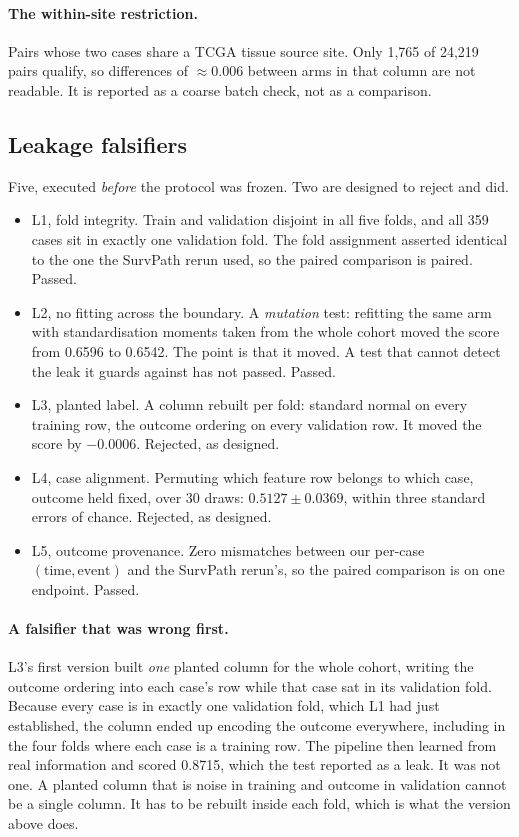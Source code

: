 \documentclass[unnumsec,webpdf,contemporary,large]{oup-authoring-template}
\begin{document}
\paragraph{The within-site restriction.} Pairs whose two cases share a TCGA tissue source site.
Only 1{,}765 of 24{,}219 pairs qualify, so differences of $\approx0.006$ between arms in that column
are not readable. It is reported as a coarse batch check, not as a comparison.

\subsection{Leakage falsifiers}

Five, executed \emph{before} the protocol was frozen. Two are designed to reject and did.

\begin{itemize}
  \item L1, fold integrity. Train and validation disjoint in all five folds, and all 359 cases sit in
    exactly one validation fold. The fold assignment asserted identical to the one the SurvPath
    rerun used, so the paired comparison is paired. Passed.
  \item L2, no fitting across the boundary. A \emph{mutation} test: refitting the same arm with
    standardisation moments taken from the whole cohort moved the score from 0.6596 to 0.6542. The
    point is that it moved. A test that cannot detect the leak it guards against has not passed.
    Passed.
  \item L3, planted label. A column rebuilt per fold: standard normal on every training row, the
    outcome ordering on every validation row. It moved the score by $-0.0006$. Rejected, as
    designed.
  \item L4, case alignment. Permuting which feature row belongs to which case, outcome held fixed,
    over 30 draws: $0.5127 \pm 0.0369$, within three standard errors of chance.
    Rejected, as designed.
  \item L5, outcome provenance. Zero mismatches between our per-case $(\text{time}, \text{event})$
    and the SurvPath rerun's, so the paired comparison is on one endpoint. Passed.
\end{itemize}

\paragraph{A falsifier that was wrong first.} L3's first version built \emph{one} planted column for
the whole cohort, writing the outcome ordering into each case's row while that case sat in its
validation fold. Because every case is in exactly one validation fold, which L1 had just established, the column ended up encoding the outcome everywhere, including in the four folds
where each case is a training row. The pipeline then learned from real information and scored
0.8715, which the test reported as a leak. It was not one. A planted column that is noise in
training and outcome in validation cannot be a single column. It has to be rebuilt inside each fold,
which is what the version above does.
\end{document}
